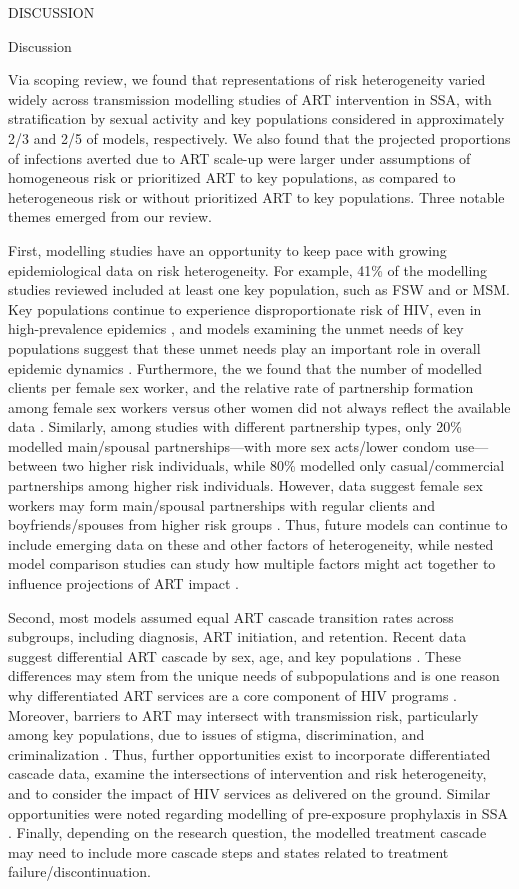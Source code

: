 DISCUSSION

Discussion

Via scoping review, we found that representations of risk heterogeneity varied widely across
transmission modelling studies of ART intervention in SSA, with
stratification by sexual activity and key populations considered in approximately
2/3 and 2/5 of models, respectively.
We also found that the projected proportions of infections averted due to ART scale-up were
larger under assumptions of homogeneous risk or prioritized ART to key populations,
as compared to heterogeneous risk or without prioritized ART to key populations.
Three notable themes emerged from our review.

First, modelling studies have an opportunity to keep pace with growing epidemiological data on risk heterogeneity.
For example, 41\% of the modelling studies reviewed included at least one key population, such as FSW and or MSM.
Key populations continue to experience disproportionate risk of HIV, even in high-prevalence epidemics \cite{AIDSinfo},
and models examining the unmet needs of key populations suggest that
these unmet needs play an important role in overall epidemic dynamics \cite{Stone2021,Bekker2015}.
Furthermore, the we found that the number of modelled clients per female sex worker, and
the relative rate of partnership formation among female sex workers versus other women
did not always reflect the available data \cite{Watts2010,Scorgie2012}.
Similarly, among studies with different partnership types, only 20\% modelled
main/spousal partnerships---with more sex acts/lower condom use---between two higher risk individuals,
while 80\% modelled only casual/commercial partnerships among higher risk individuals.
However, data suggest female sex workers may form main/spousal partnerships
with regular clients and boyfriends/spouses from higher risk groups \cite{Scorgie2012}.
Thus, future models can continue to include emerging data on these and other factors of heterogeneity,
while nested model comparison studies can study how
multiple factors might act together to influence projections of ART impact \cite{Dodd2010,Hontelez2013}.

Second, most models assumed equal ART cascade transition rates across subgroups,
including diagnosis, ART initiation, and retention.
Recent data suggest differential ART cascade by sex, age, and key populations
\cite{Lancaster2016,Schwartz2017,Ma2020,Green2020}.
These differences may stem from the unique needs of subpopulations
and is one reason why differentiated ART services are a core component of HIV programs
\cite{Chikwari2018,Ehrenkranz2019}.
Moreover, barriers to ART may intersect with transmission risk, particularly among key populations,
due to issues of stigma, discrimination, and criminalization \cite{Ortblad2019,Baral2019}.
Thus, further opportunities exist to incorporate differentiated cascade data,
examine the intersections of intervention and risk heterogeneity, and
to consider the impact of HIV services as delivered on the ground.
Similar opportunities were noted regarding modelling of pre-exposure prophylaxis in SSA \cite{Case2019}.
Finally, depending on the research question, the modelled treatment cascade may need
to include more cascade steps and states related to treatment failure/discontinuation.

